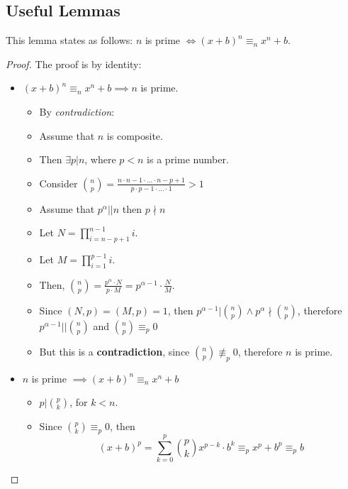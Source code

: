 \subsection{Useful Lemmas}
\begin{lemma}\label{newtown_form_lemma}
    This lemma states as follows:\newline
    $n$ is prime $\iff (x + b)^{n} \equiv_{n} x^{n} + b$.
\end{lemma}
\begin{proof}
    The proof is by identity:
    \begin{itemize}
        \item $(x + b)^{n} \equiv_{n} x^{n} + b \implies n$ is prime.
        \begin{itemize}
            \item By \emph{contradiction}:
            \item Assume that $n$ is composite.
            \item Then $\exists p | n$, where $p < n$ is a prime number.
            \item Consider $\binom{n}{p} = \frac{n \cdot n-1 \cdot \dots \cdot n - p + 1}{p \cdot p - 1 \cdot \dots \cdot 1} > 1$
            \item Assume that $p^{\alpha} || n$ then $p \nmid n$
            \item Let $N = \prod_{i = n-p+1}^{n-1} i$.
            \item Let $M = \prod_{i = 1}^{p-1} i$.
            \item Then, $\binom{n}{p} = \frac{p^{\alpha} \cdot N}{p \cdot M} = p^{\alpha - 1} \cdot \frac{N}{M}$.
            \item Since $(N,p) = (M, p) = 1$, then $p^{\alpha - 1} | \binom{n}{p} \land p^{\alpha} \nmid \binom{n}{p}$, therefore $p^{\alpha - 1} || \binom{n}{p}$ and $\binom{n}{p} \equiv_{p} 0$
            \item But this is a \textbf{contradiction}, since $\binom{n}{p} \not\equiv_{p} 0$, therefore $n$ is prime.

        \end{itemize}
        \item $n$ is prime $\implies (x + b)^{n} \equiv_{n} x^{n} + b$
        \begin{itemize}
            \item $p | \binom{p}{k}$, for $k < n$.
            \item Since $\binom{p}{k} \equiv_{p} 0$, then
            \[(x + b)^{p} = \sum_{k=0}^{p} \binom{p}{k} x^{p-k} \cdot b^{k} \equiv_{p} x^{p} + b^{p} \equiv_{p} b\]
        \end{itemize}
    \end{itemize}
\end{proof}

